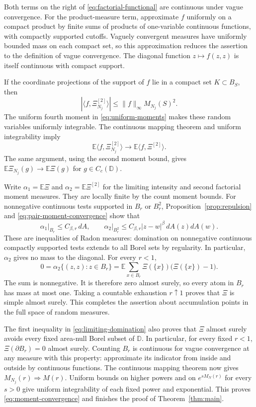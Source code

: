 \documentclass[11pt,a4paper]{article}
\numberwithin{equation}{section}
\theoremstyle{remark}
\newcommand{\D}{\mathbb D}
\newcommand{\E}{\mathbb E}
\begin{document}
Both terms on the right of \eqref{eq:factorial-functional} are
continuous under vague convergence. For the product-measure term,
approximate $f$ uniformly on a compact product by finite sums of
products of one-variable continuous functions, with compactly
supported cutoffs. Vaguely convergent measures have uniformly bounded
mass on each compact set, so this approximation reduces the assertion
to the definition of vague convergence. The diagonal function
$z\mapsto f(z,z)$ is itself continuous with compact support.

If the coordinate projections of the support of $f$ lie in a compact
set $K\subset B_S$, then
\[
 |\langle f,\Xi_{N_j}^{[2]}\rangle|
 \le\|f\|_\infty M_{N_j}(S)^2.
\]
The uniform fourth moment in \eqref{eq:uniform-moments} makes these
random variables uniformly integrable. The continuous mapping theorem
and uniform integrability imply
\begin{equation}\label{eq:pair-moment-convergence}
 \E\langle f,\Xi_{N_j}^{[2]}\rangle
 \longrightarrow\E\langle f,\Xi^{[2]}\rangle.
\end{equation}
The same argument, using the second moment bound, gives
$\E\Xi_{N_j}(g)\to\E\Xi(g)$ for $g\in C_c(\D)$.

Write $\alpha_1=\E\Xi$ and $\alpha_2=\E\Xi^{[2]}$ for the
limiting intensity and second factorial moment measures.
They are locally finite by the count moment bounds.
For nonnegative continuous tests supported in $B_r$ or $B_r^2$,
Proposition~\ref{prop:repulsion} and
\eqref{eq:pair-moment-convergence} show that
\begin{equation}\label{eq:limiting-domination}
 \alpha_1\big|_{B_r}\le C_{\beta,r}\,dA,
 \qquad
 \alpha_2\big|_{B_r^2}
 \le C_{\beta,r}|z-w|^\beta\,dA(z)dA(w).
\end{equation}
These are inequalities of Radon measures: domination on nonnegative
continuous compactly supported tests extends to all Borel sets by
regularity. In particular, $\alpha_2$ gives no mass to the diagonal.
For every $r<1$,
\[
 0=\alpha_2\{(z,z):z\in B_r\}
   =\E\sum_{x\in B_r}
       \Xi(\{x\})\bigl(\Xi(\{x\})-1\bigr).
\]
The sum is nonnegative. It is therefore zero almost surely, so every
atom in $B_r$ has mass at most one. Taking a countable exhaustion
$r\uparrow1$ proves that $\Xi$ is simple almost surely.
This completes the assertion about accumulation points in the full
space of random measures.

The first inequality in \eqref{eq:limiting-domination} also proves
that $\Xi$ almost surely avoids every fixed area-null Borel subset
of $\D$. In particular, for every fixed $r<1$,
$\Xi(\partial B_r)=0$ almost surely. Counting $B_r$ is continuous
for vague convergence at any measure with this property: approximate
its indicator from inside and outside by continuous functions.
The continuous mapping theorem now gives
$M_{N_j}(r)\Rightarrow M(r)$.
Uniform bounds on higher powers and on $e^{sM_N(r)}$ for every $s>0$
give uniform integrability of each fixed power and exponential.
This proves \eqref{eq:moment-convergence} and finishes the proof of
Theorem~\ref{thm:main}.
\end{document}
